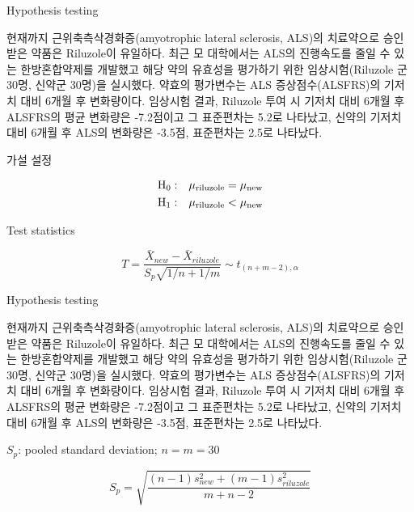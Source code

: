 \documentclass[9pt,ignorenonframetext,xcolor=dvipsnames]{beamer}
\begin{document}
\begin{frame}{Hypothesis testing}

\begin{tcolorbox}[colback=gray!10,colframe=black, title=\textbf{Example: New drugs for ALS}]
  \scriptsize  
  현재까지 근위축측삭경화증(amyotrophic lateral sclerosis, ALS)의 치료약으로 승인 받은 약품은 Riluzole이 유일하다. 최근 모 대학에서는 ALS의 진행속도를 줄일 수 있는 한방혼합약제를 개발했고 해당 약의 유효성을 평가하기 위한 임상시험(Riluzole 군 30명, 신약군 30명)을 실시했다. 약효의 평가변수는 ALS 증상점수(ALSFRS)의 기저치 대비 6개월 후 변화량이다. 임상시험 결과, Riluzole 투여 시 기저치 대비 6개월 후 ALSFRS의 평균 변화량은 -7.2점이고 그 표준편차는 5.2로 나타났고, 신약의 기저치 대비  6개월 후 ALS의 변화량은 -3.5점, 표준편차는 2.5로 나타났다. 
\end{tcolorbox}

\begin{block}{가설 설정}

\begin{eqnarray}
\mathrm{H}_{0} &:& \mu_{\mathrm{riluzole}} = \mu_{\mathrm{new}} \notag \\ 
\mathrm{H}_{1} &:& \mu_{\mathrm{riluzole}} < \mu_{\mathrm{new}} \notag
\end{eqnarray}

\end{block}

\begin{block}{Test statistics}

\[
  T = \frac{\bar{X}_{new} - \bar{X}_{riluzole}}{S_{p}\sqrt{1/n + 1/m}} \sim t_{(n+m-2), \alpha}
\]

\end{block}

\end{frame}

\begin{frame}{Hypothesis testing}

\begin{tcolorbox}[colback=gray!10,colframe=black, title=\textbf{Example: New drugs for ALS}]
  \scriptsize  
  현재까지 근위축측삭경화증(amyotrophic lateral sclerosis, ALS)의 치료약으로 승인 받은 약품은 Riluzole이 유일하다. 최근 모 대학에서는 ALS의 진행속도를 줄일 수 있는 한방혼합약제를 개발했고 해당 약의 유효성을 평가하기 위한 임상시험(Riluzole 군 30명, 신약군 30명)을 실시했다. 약효의 평가변수는 ALS 증상점수(ALSFRS)의 기저치 대비 6개월 후 변화량이다. 임상시험 결과, Riluzole 투여 시 기저치 대비 6개월 후 ALSFRS의 평균 변화량은 -7.2점이고 그 표준편차는 5.2로 나타났고, 신약의 기저치 대비  6개월 후 ALS의 변화량은 -3.5점, 표준편차는 2.5로 나타났다. 
\end{tcolorbox}

\(S_{p}\): pooled standard deviation; \(n=m=30\)

\[
  S_{p} = \sqrt{\frac{(n-1)s^{2}_{new} + (m-1)s^{2}_{riluzole}}{m+n-2}}
\]

\end{frame}
\end{document}

